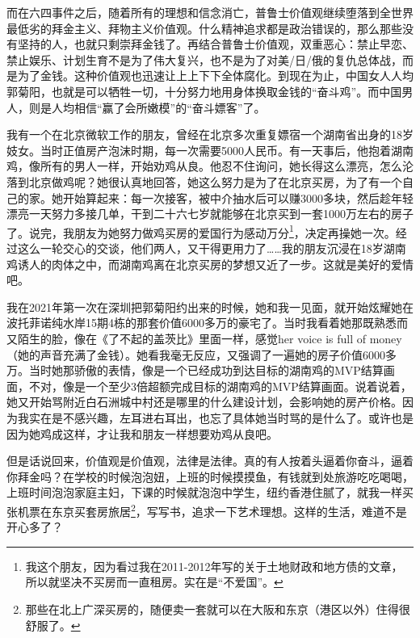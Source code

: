 而在六四事件之后，随着所有的理想和信念消亡，普鲁士价值观继续堕落到全世界最低劣的拜金主义、拜物主义价值观。什么精神追求都是政治错误的，那么那些没有坚持的人，也就只剩崇拜金钱了。再结合普鲁士价值观，双重恶心：禁止早恋、禁止娱乐、计划生育不是为了伟大复兴，也不是为了对美/日/俄的复仇总体战，而是为了金钱。这种价值观也迅速让上上下下全体腐化。到现在为止，中国女人人均郭菊阳，也就是可以牺牲一切，十分努力地用身体换取金钱的``奋斗鸡''。而中国男人，则是人均相信``赢了会所嫩模''的``奋斗嫖客''了。

我有一个在北京微软工作的朋友，曾经在北京多次重复嫖宿一个湖南省出身的18岁妓女。当时正值房产泡沫时期，每一次需要5000人民币。有一天事后，他抱着湖南鸡，像所有的男人一样，开始劝鸡从良。他忍不住询问，她长得这么漂亮，怎么沦落到北京做鸡呢？她很认真地回答，她这么努力是为了在北京买房，为了有一个自己的家。她开始算起来：每一次接客，被中介抽水后可以赚3000多块，然后趁年轻漂亮一天努力多接几单，干到二十六七岁就能够在北京买到一套1000万左右的房子了。说完，我朋友为她努力做鸡买房的爱国行为感动万分\footnote{我这个朋友，因为看过我在2011-2012年写的关于土地财政和地方债的文章，所以就坚决不买房而一直租房。实在是``不爱国''。}，决定再操她一次。经过这么一轮交心的交谈，他们两人，又干得更用力了……我的朋友沉浸在18岁湖南鸡诱人的肉体之中，而湖南鸡离在北京买房的梦想又近了一步。这就是美好的爱情吧。

我在2021年第一次在深圳把郭菊阳约出来的时候，她和我一见面，就开始炫耀她在波托菲诺纯水岸15期4栋的那套价值6000多万的豪宅了。当时我看着她那既熟悉而又陌生的脸，像在《了不起的盖茨比》里面一样，感觉her voice is full of money（她的声音充满了金钱）。她看我毫无反应，又强调了一遍她的房子价值6000多万。当时她那骄傲的表情，像是一个已经成功到达目标的湖南鸡的MVP结算画面，不对，像是一个至少3倍超额完成目标的湖南鸡的MVP结算画面。说着说着，她又开始骂附近白石洲城中村还是哪里的什么建设计划，会影响她的房产价格。因为我实在是不感兴趣，左耳进右耳出，也忘了具体她当时骂的是什么了。或许也是因为她鸡成这样，才让我和朋友一样想要劝鸡从良吧。

但是话说回来，价值观是价值观，法律是法律。真的有人按着头逼着你奋斗，逼着你拜金吗？在学校的时候泡泡妞，上班的时候摸摸鱼，有钱就到处旅游吃吃喝喝，上班时间泡泡家庭主妇，下课的时候就泡泡中学生，纽约香港住腻了，就我一样买张机票在东京买套房旅居\footnote{那些在北上广深买房的，随便卖一套就可以在大阪和东京（港区以外）住得很舒服了。}，写写书，追求一下艺术理想。这样的生活，难道不是开心多了？
